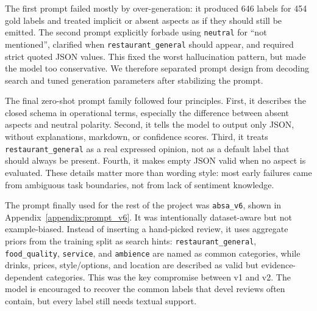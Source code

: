 \documentclass[11pt,a4paper]{article}
\newcommand{\code}[1]{\texttt{#1}}
\begin{document}
The first prompt failed mostly by over-generation: it produced 646 labels for 454 gold labels and treated implicit or absent aspects as if they should still be emitted. The second prompt explicitly forbade using \code{neutral} for ``not mentioned'', clarified when \code{restaurant\_general} should appear, and required strict quoted JSON values. This fixed the worst hallucination pattern, but made the model too conservative. We therefore separated prompt design from decoding search and tuned generation parameters after stabilizing the prompt.

The final zero-shot prompt family followed four principles. First, it describes the closed schema in operational terms, especially the difference between absent aspects and neutral polarity. Second, it tells the model to output only JSON, without explanations, markdown, or confidence scores. Third, it treats \code{restaurant\_general} as a real expressed opinion, not as a default label that should always be present. Fourth, it makes empty JSON valid when no aspect is evaluated. These details matter more than wording style: most early failures came from ambiguous task boundaries, not from lack of sentiment knowledge.

The prompt finally used for the rest of the project was \code{absa\_v6}, shown in Appendix~\ref{appendix:prompt_v6}. It was intentionally dataset-aware but not example-biased. Instead of inserting a hand-picked review, it uses aggregate priors from the training split as search hints: \code{restaurant\_general}, \code{food\_quality}, \code{service}, and \code{ambience} are named as common categories, while drinks, prices, style/options, and location are described as valid but evidence-dependent categories. This was the key compromise between v1 and v2. The model is encouraged to recover the common labels that devel reviews often contain, but every label still needs textual support.
\end{document}

